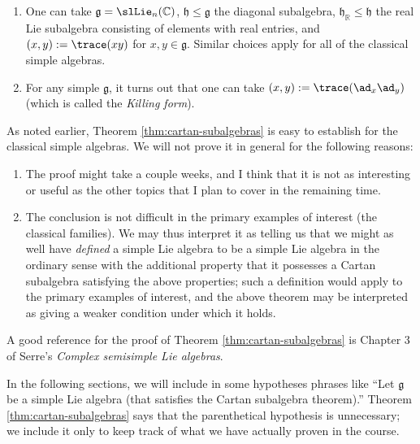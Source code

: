 \documentclass[reqno]{amsart} 
\begin{document}
\begin{example}
  \begin{enumerate}
  \item One can take $\mathfrak{g} = \slLie_n(\mathbb{C})$, $\mathfrak{h} \leq \mathfrak{g}$ the diagonal subalgebra, $\mathfrak{h}_\mathbb{R} \leq \mathfrak{h}$ the real Lie subalgebra consisting of elements with real entries, and $(x,y) := \trace(x y)$ for $x,y \in \mathfrak{g}$.  Similar choices apply for all of the classical simple algebras.
  \item For any simple $\mathfrak{g}$, it turns out that one can take $(x,y) := \trace(\ad_x \ad_y)$ (which is called the \emph{Killing form}).
  \end{enumerate}
\end{example}

As noted earlier, Theorem \ref{thm:cartan-subalgebras} is easy to establish for the classical simple algebras.  We will not prove it in general for the following reasons:
\begin{enumerate}
\item The proof might take a couple weeks, and I think that it is not as interesting or useful as the other topics that I plan to cover in the remaining time.
\item The conclusion is not difficult in the primary examples of interest (the classical families).  We may thus interpret it as telling us that we might as well have \emph{defined} a simple Lie algebra to be a simple Lie algebra in the ordinary sense with the additional property that it possesses a Cartan subalgebra satisfying the above properties; such a definition would apply to the primary examples of interest, and the above theorem may be interpreted as giving a weaker condition under which it holds.
\end{enumerate}
A good reference for the proof of Theorem \ref{thm:cartan-subalgebras} is Chapter 3 of Serre's \emph{Complex semisimple Lie algebras}.

In the following sections, we will include in some hypotheses phrases like ``Let $\mathfrak{g}$ be a simple Lie algebra (that satisfies the Cartan subalgebra theorem).''  Theorem \ref{thm:cartan-subalgebras} says that the parenthetical hypothesis is unnecessary; we include it only to keep track of what we have actually proven in the course.
\end{document}
